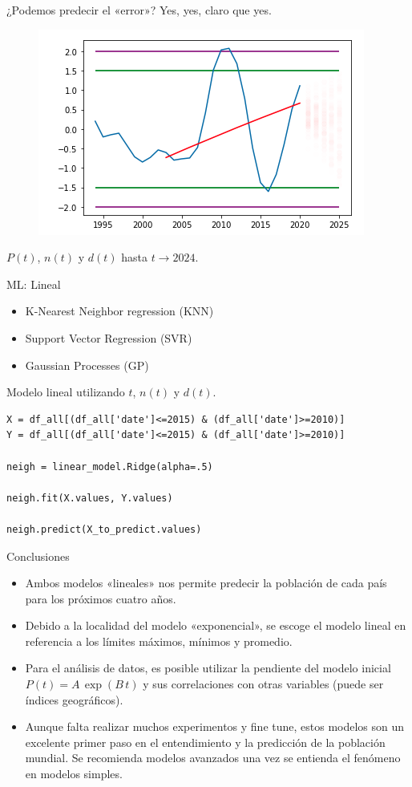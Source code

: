 \documentclass[10pt]{beamer}
\begin{document}
\begin{frame}{¿Podemos predecir el «error»? Yes, yes, claro que yes. }
\begin{figure}
\includegraphics[scale=0.3]{img/14.png}
\end{figure}
$P(t)$, $n(t)$ y $d(t)$ hasta $t\rightarrow 2024$.
\end{frame}

\begin{frame}[fragile]{ML: Lineal}
\begin{itemize}
\item K-Nearest Neighbor regression (KNN)
\item Support Vector Regression (SVR)
\item Gaussian Processes (GP)
\end{itemize}
Modelo lineal utilizando $t$, $n(t)$ y $d(t)$.
\begin{verbatim}
X = df_all[(df_all['date']<=2015) & (df_all['date']>=2010)]
Y = df_all[(df_all['date']<=2015) & (df_all['date']>=2010)]

neigh = linear_model.Ridge(alpha=.5)

neigh.fit(X.values, Y.values)

neigh.predict(X_to_predict.values)
\end{verbatim}
\end{frame}

\begin{frame}{Conclusiones}
\begin{itemize}
\item \justifying Ambos modelos «lineales» nos permite predecir la población de cada país para los próximos cuatro años.
\item Debido a la localidad del modelo «exponencial», se escoge el modelo lineal en referencia a los límites máximos, mínimos y promedio. 
\item Para el análisis de datos, es posible utilizar la pendiente del modelo inicial $P(t)=A\,\exp(B\,t)$ y sus correlaciones con otras variables (puede ser índices geográficos).
\item Aunque falta realizar muchos experimentos y fine tune, estos modelos son un excelente primer paso en el entendimiento y la predicción de la población mundial. Se recomienda modelos avanzados una vez se entienda el fenómeno en modelos simples. 
\end{itemize}
\end{frame}
\end{document}
